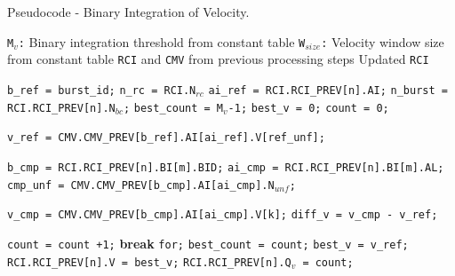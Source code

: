 \begin{algorithm}
\caption{Pseudocode - Binary Integration of Velocity\cite{fcas}.}
\label{mm:biv:pseudo_code}
\begin{algorithmic}[1]
	\Require 
		\Statex \texttt{M$_v$:} Binary integration threshold from constant table
		\Statex \texttt{W$_{size}$:} Velocity window size from constant table
		\Statex \texttt{RCI} and \texttt{CMV} from previous processing steps
	\Ensure
		\Statex Updated \texttt{RCI}
		\Statex

	\LState \texttt{b\_ref = burst\_id;}
	\LState \texttt{n\_rc = RCI.N$_{rc}$}
		\LState \texttt{ai\_ref = RCI.RCI\_PREV[n].AI;}
		\LState \texttt{n\_burst = RCI.RCI\_PREV[n].N$_{bc}$;}
		\LState \texttt{best\_count = M$_v$-1;}
		\LState \texttt{best\_v = 0;}
		\LState \texttt{count = 0;}
		
			\LState \texttt{v\_ref = CMV.CMV\_PREV[b\_ref].AI[ai\_ref].V[ref\_unf];}
			
				\LState \texttt{b\_cmp = RCI.RCI\_PREV[n].BI[m].BID;}
				\LState \texttt{ai\_cmp = RCI.RCI\_PREV[n].BI[m].AL;}
				\LState \texttt{cmp\_unf =  CMV.CMV\_PREV[b\_cmp].AI[ai\_cmp].N$_{unf}$;}
				
					\LState \texttt{v\_cmp = CMV.CMV\_PREV[b\_cmp].AI[ai\_cmp].V[k];}
					\LState \texttt{diff\_v = v\_cmp - v\_ref;}
					
						\LState \texttt{count = count +1;}
						\LState \textbf{break } \texttt{for;}
					\EndIf
				\EndFor
			\EndFor
				\LState \texttt{best\_count = count;}
				\LState \texttt{best\_v = v\_ref;}
			\EndIf
		\EndFor
		\LState \texttt{RCI.RCI\_PREV[n].V = best\_v;}
		\LState \texttt{RCI.RCI\_PREV[n].Q$_v$ = count;}
	\EndFor
\end{algorithmic}
\end{algorithm}

